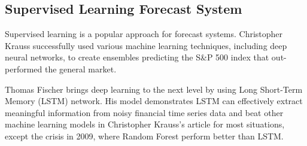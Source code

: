 \subsection{Supervised Learning Forecast System}
Supervised learning is a popular approach for forecast systems. Christopher Krauss successfully used various machine learning techniques, including deep neural networks, to create ensembles predicting the S\&P 500 index that out-performed the general market\cite{KRAUSS2017689}.
\par

Thomas Fischer brings deep learning to the next level by using Long Short-Term Memory (LSTM) network\cite{FISCHER2018654}. His model demonstrates LSTM can effectively extract meaningful information from noisy financial time series data and beat other machine learning models in Christopher Krauss's article\cite{KRAUSS2017689} for most situations, except the crisis in 2009, where Random Forest perform better than LSTM.